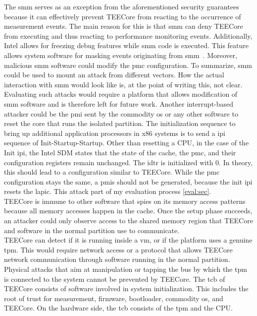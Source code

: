 The \gls{smm} serves as an exception from the aforementioned security guarantees
because it can effectively prevent TEECore from reacting to the occurrence of
measurement events. The main reason for this is that \gls{smm} can deny TEECore
from executing and thus reacting to performance monitoring events. Additionally,
Intel allows for freezing debug features while \gls{smm} code is executed. This
feature allows system software for masking events originating from
\gls{smm}~\cite{intel_sdm}. Moreover, malicious \gls{smm} software could modify
the \gls{pmc} configuration. To summarize, \gls{smm} could be used to mount an
attack from different vectors. How the actual interaction with \gls{smm} would
look like is, at the point of writing this, not clear. Evaluating such attacks
would require a platform that allows modification of \gls{smm} software and is
therefore left for future work. Another interrupt-based attacker could be the
\gls{pmi} sent by the commodity \gls{os} or any other software to reset the core
that runs the isolated partition. The initialization sequence to bring up
additional application processors in x86 systems is to send a \gls{ipi} sequence
of Init-Startup-Startup. Other than resetting a CPU, in the case of the Init
\gls{ipi}, the Intel SDM states that the state of the cache, the \gls{pmc}, and
their configuration registers remain unchanged. The \gls{idtr} is initialized
with 0. In theory, this should lead to a configuration similar to TEECore. While
the \gls{pmc} configuration stays the same, a \glspl{pmi} should not be
generated, because the init \gls{ipi} resets the \gls{lapic}. This attack part
of my evaluation process \ref{eval:sec}.\\

TEECore is immune to other software that spies on its memory access patterns
because all memory accesses happen in the cache. Once the setup phase succeeds,
an attacker could only observe access to the shared memory region that TEECore
and software in the normal partition use to communicate.\\

TEECore can detect if it is running inside a \gls{vm}, or if the
platform uses a genuine \gls{tpm}. This would require network access or a
protocol that allows TEECore network communication through software running in
the normal partition. Physical attacks that aim at manipulation or tapping the
bus by which the \gls{tpm} is connected to the system cannot be prevented
by TEECore. The \gls{tcb} of TEECore consists of software involved in
system initialization. This includes the root of trust for measurement,
firmware, bootloader, commodity \gls{os}, and TEECore. On the hardware side, the
\gls{tcb} consists of the \gls{tpm} and the CPU.

\cleardoublepage

